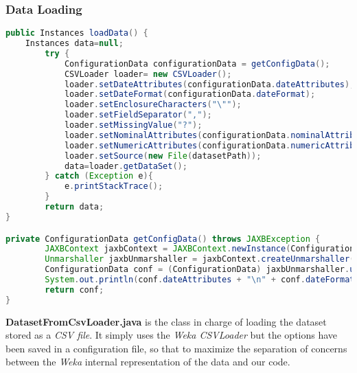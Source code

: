 \subsubsection{Data Loading}
\begin{lstlisting}[language=Java]
public Instances loadData() {
	Instances data=null;
        try {
            ConfigurationData configurationData = getConfigData();
            CSVLoader loader= new CSVLoader();
            loader.setDateAttributes(configurationData.dateAttributes);
            loader.setDateFormat(configurationData.dateFormat);
            loader.setEnclosureCharacters("\"");
            loader.setFieldSeparator(",");
            loader.setMissingValue("?");
            loader.setNominalAttributes(configurationData.nominalAttributes);
            loader.setNumericAttributes(configurationData.numericAttributes);
            loader.setSource(new File(datasetPath));
            data=loader.getDataSet();
        } catch (Exception e){
            e.printStackTrace();
        }
        return data;
}

private ConfigurationData getConfigData() throws JAXBException {
        JAXBContext jaxbContext = JAXBContext.newInstance(ConfigurationData.class);
        Unmarshaller jaxbUnmarshaller = jaxbContext.createUnmarshaller();
        ConfigurationData conf = (ConfigurationData) jaxbUnmarshaller.unmarshal(new File(confDataPath));
        System.out.println(conf.dateAttributes + "\n" + conf.dateFormat + "\n" + conf.numericAttributes);
        return conf;
}
\end{lstlisting}

\textbf{DatasetFromCsvLoader.java} is the class in charge of loading the dataset stored as a \textit{CSV file}. It simply uses the \textit{Weka CSVLoader} but the options have been saved in a configuration file, so that to maximize the separation of concerns between the \textit{Weka} internal representation of the data and our code.

